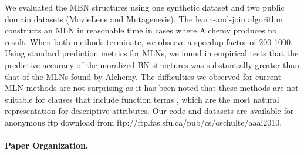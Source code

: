 \documentclass[letterpaper]{article}
\begin{document}
We evaluated the MBN structures using one synthetic dataset and two public domain datasets (MovieLens and Mutagenesis). The learn-and-join algorithm constructs an MLN in reasonable time in cases where Alchemy produces no result. When both methods terminate, we observe a speedup factor of 200-1000.
Using standard prediction metrics for MLNs, we found in empirical tests that the predictive accuracy of the moralized BN structures was substantially greater than that of the MLNs found by Alchemy. 
The difficulties we observed for current MLN methods are not surprising as it has been noted that these methods are not suitable for clauses that include function terms \cite[Sec.8]{Mihalkova2007}, which are the most natural representation for descriptive attributes. Our code and datasets are available for anonymous ftp download from ftp://ftp.fas.sfu.ca/pub/cs/oschulte/aaai2010. 


\paragraph{Paper Organization.}

\end{document}
